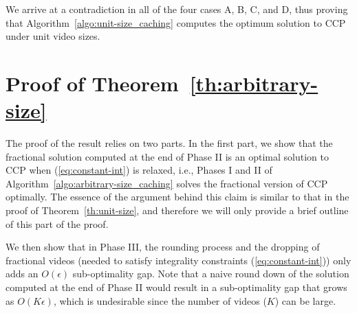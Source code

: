 \documentclass[conference]{IEEEtran}
\begin{document}
We arrive at a contradiction in all of the four cases A, B, C, and D, thus proving that Algorithm~\ref{algo:unit-size_caching} computes the optimum solution to CCP under unit video sizes. %



\section*{Proof of Theorem~\ref{th:arbitrary-size}}
The proof of the result relies on two parts. In the first part, we show that the fractional solution computed at the end of Phase II is an optimal solution to CCP when (\ref{eq:constant-int}) is relaxed, i.e., Phases I and II of Algorithm~\ref{algo:arbitrary-size_caching} solves the fractional version of CCP optimally. The essence of the argument behind this claim is similar to that in the proof of Theorem~\ref{th:unit-size}, and therefore we will only provide a brief outline of this part of the proof.

We then show that in Phase III, the rounding process and the dropping of fractional videos (needed to satisfy integrality constraints (\ref{eq:constant-int})) only adds an $O(\epsilon)$ sub-optimality gap. Note that a naive round down of the solution computed at the end of Phase II would result in a sub-optimality gap that grows as $O(K \epsilon)$, which is undesirable since the number of videos ($K$) can be large. 
\end{document}
